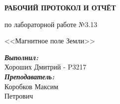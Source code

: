 \documentclass[12pt, a4paper]{article}
\begin{document}

\vspace*{0.25\textheight}
\begin{center}
\textbf{\LARGE РАБОЧИЙ ПРОТОКОЛ И ОТЧЁТ }

\LARGE по лабораторной работе №3.13

\LARGE <<Магнитное поле Земли>>

\end{center}
\vspace*{5cm}
\begin{flushright}
\begin{minipage}{.33\linewidth}
\textit{\textbf{Выполнил:}}\\
Хороших Дмитрий - P3217\\
\textit{\textbf{Преподаватель:}}\\
Коробков Максим\\ Петрович
\end{minipage}
\end{flushright}


\thispagestyle{firstpage}
\newpage
\tableofcontents

\restoregeometry
\end{document}
